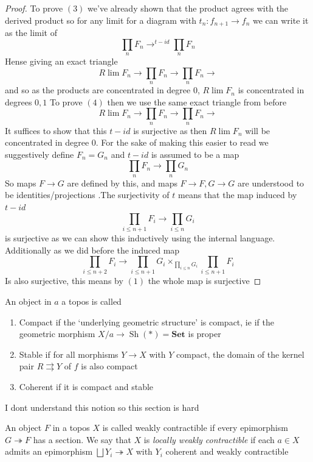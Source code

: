 \documentclass{article}
\begin{document}
\begin{proof}
\newline
To prove $(3)$ we've already shown that the product agrees with the derived product so for any limit for a diagram with $t_n:f_{n+1} \to f_n$ we can write it as the limit of 
\[
\prod_n F_n \to^{t-id} \prod_n F_n
\]
Hense giving an exact triangle
\[
R \lim F_n \to \prod_n F_n \to \prod_n F_n \to
\]
and so as the products are concentrated in degree $0$, $R\lim F_n$ is concentrated in degrees $0,1$
\newline
To prove $(4)$ then we use the same exact triangle from before
\[
R \lim F_n \to \prod_n F_n \to \prod_n F_n \to
\]
It suffices to show that this $t-id$ is surjective as then $R\lim F_n$ will be concentrated in degree $0$. For the sake of making this easier to read we suggestively define $F_n = G_n$ and $t-id$ is assumed to be a map 
\[
\prod_n F_n \to \prod_n G_n
\]
So maps $F \to G$ are defined by this, and maps $F\to F,G \to G$ are understood to be identities/projections .The surjectivity of $t$ means that the map induced by $t-id$
\[
\prod_{i \leq n+1} F_i \to \prod_{i \leq n} G_i
\]
is surjective as we can show this inductively using the internal language. Additionally as we did before the induced map 
\[
\prod_{i \leq n+2} F_i \to \prod_{i \leq n+1}G_i\times_{\prod_{i \leq n}G_i}\prod_{i \leq n+1}F_i
\]
Is also surjective, this means by $(1)$ the whole map is surjective
\end{proof}
\begin{definition}
    An object in $a$ a topos is called
    \begin{enumerate}
        \item Compact if the `underlying geometric structure' is compact, ie if the geometric morphism $X/a \to \operatorname{Sh}(*)=\mathbf{Set}$ is proper
        \item Stable if for all morphisms $Y \to X$ with $Y$ compact, the domain of the kernel pair $R \rightrightarrows Y$ of $f$ is also compact
        \item Coherent if it is compact and stable
    \end{enumerate}
\end{definition}
\color{red}I dont understand this notion so this section is hard\color[HTML]{756244}
\begin{definition}
    An object $F$ in a topos $X$ is called weakly contractible if every epimorphism $G \twoheadrightarrow F$ has a section. We say that $X$ is \textit{locally weakly contractible} if each $a \in X$ admits an epimorphism $\bigsqcup Y_i \twoheadrightarrow X$ with $Y_i$ coherent and weakly contractible
\end{definition}
\end{document}
